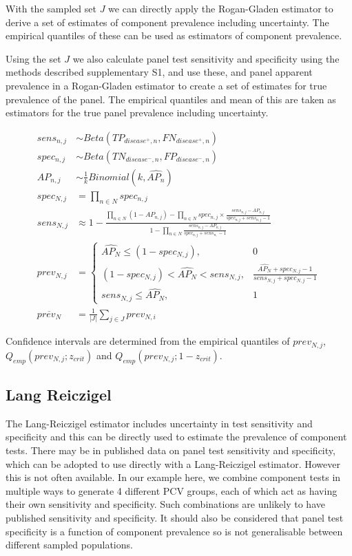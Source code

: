 \documentclass[a4paper, 12pt, twoside]{article}
\let\Oldsubsection\subsection
\renewcommand{\subsection}{\FloatBarrier\Oldsubsection}
\begin{document}
With the sampled set \(J\) we can directly apply the Rogan-Gladen estimator to derive a set of estimates of component prevalence including uncertainty. The empirical quantiles of these can be used as estimators of component prevalence.

Using the set \(J\) we also calculate panel test sensitivity and specificity using the methods described supplementary S1, and use these, and panel apparent prevalence in a Rogan-Gladen estimator \cite{rogan1978} to create a set of estimates for true prevalence of the panel. The empirical quantiles and mean of this are taken as estimators for the true panel prevalence including uncertainty.

\begin{equation*}
\begin{aligned}
sens_{n,j} &\sim Beta(TP_{disease^+,n}, FN_{disease^+,n}) \\
spec_{n,j} &\sim Beta(TN_{disease^-,n}, FP_{disease^-,n}) \\
AP_{n,j} &\sim \frac{1}{k}Binomial(k, \widehat{AP_n}) \\
spec_{N,j} &= \prod_{n \in N}{spec_{n,j}} \\
sens_{N,j} &\approx 1-\frac{
  \prod_{n \in N}{(1-AP_{n,j})} - \prod_{n \in N}{spec_{n,j} \times \frac{sens_{n,j}-AP_{n,j}}{spec_{n,j} + sens_{n,j} - 1}}
}{
  1 - \prod_{n \in N}{ \frac{sens_{n,j}-AP_{n,j}}{spec_{n,j} + sens_{n,} - 1} }
} \\
prev_{N,j} &= \begin{cases}
    \widehat{AP_N} \le (1-spec_{N,j}), & 0 \\
    (1-spec_{N,j}) < \widehat{AP_N} < sens_{N,j}, & \frac{\widehat{AP_N} + spec_{N,j} -1}{sens_{N,j} + spec_{N,j} - 1} \\
    sens_{N,j} \le \widehat{AP_N}, & 1
  \end{cases} \\
\overline{prev_N} &= \frac{1}{|J|}\sum_{j \in J}{prev_{N,i}}
\end{aligned}
\end{equation*}

Confidence intervals are determined from the empirical quantiles of \(prev_{N,j}\), \(Q_{emp}(prev_{N,j};z_{crit})\) and \(Q_{emp}(prev_{N,j};1-z_{crit})\).

\subsection{Lang Reiczigel}

The Lang-Reiczigel estimator\cite{lang2014} includes uncertainty in test sensitivity and specificity and this can be directly used to estimate the prevalence of component tests. There may be in published data on panel test sensitivity and specificity, which can be adopted to use directly with a Lang-Reiczigel estimator. However this is not often available. In our example here, we combine component tests in multiple ways to generate 4 different PCV groups, each of which act as having their own sensitivity and specificity. Such combinations are unlikely to have published sensitivity and specificity. It should also be considered that panel test specificity is a function of component prevalence so is not generalisable between different sampled populations.
\end{document}
